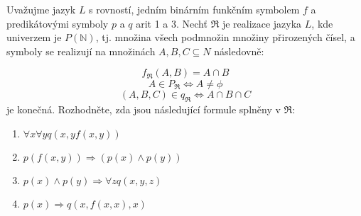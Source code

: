 Uvažujme jazyk $L$ s rovností, jedním binárním funkčním symbolem $f$ a
predikátovými symboly $p$ a $q$ arit 1 a 3. Nechť $\Re$ je realizace jazyka $L$, 
kde univerzem je $P(\mathbb{N})$, tj. množina všech podmnožin množiny přirozených čísel, a symboly se realizují
na množinách $A, B, C \subseteq  N$ následovně:

$$f_{\Re }(A,B)=A\cap B$$
$$A \in P_{\Re} \Leftrightarrow A \neq \phi $$
$$(A,B,C) \in q_{\Re} \Leftrightarrow A \cap B \cap C$$ je konečná.
Rozhodněte, zda jsou následující formule splněny v $\Re$:
\begin{enumerate}[1)]
  \item $\forall x \forall y q(x,yf(x,y))$
  \item $p(f(x,y)) \Rightarrow (p(x) \wedge p(y))$
  \item $p(x) \wedge p(y) \Rightarrow \forall z q(x,y,z)$
  \item $p(x) \Rightarrow q(x, f(x,x), x)$
\end{enumerate}
